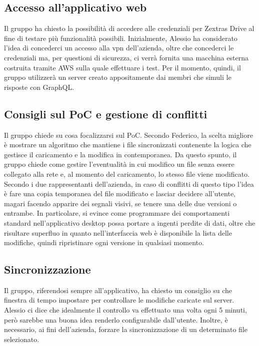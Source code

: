 \subsection{Accesso all'applicativo web}
Il gruppo ha chiesto la possibilità di accedere alle credenziali per Zextras Drive al fine di testare più funzionalità possibili. Inizialmente, Alessio ha considerato l'idea di concederci un accesso alla vpn dell'azienda, oltre che concederci le credenziali ma, per questioni di sicurezza, ci verrà fornita una macchina esterna costruita tramite AWS sulla quale effettuare i test. Per il momento, quindi, il gruppo utilizzerà un server creato appositamente dai membri che simuli le risposte con GraphQL.
\subsection{Consigli sul PoC e gestione di conflitti}
Il gruppo chiede su cosa focalizzarsi sul PoC. Secondo Federico, la scelta migliore è mostrare un algoritmo che mantiene i file sincronizzati contenente la logica che gestisce il caricamento e la modifica in contemporanea. Da questo spunto, il gruppo chiede come gestire l'eventualità in cui modifico un file senza essere collegato alla rete e, al momento del caricamento, lo stesso file viene modificato. Secondo i due rappresentanti dell'azienda, in caso di conflitti di questo tipo l'idea è fare una copia temporanea del file modificato e lasciar decidere all'utente, magari facendo apparire dei segnali visivi, se tenere una delle due versioni o entrambe.  In particolare, si evince come programmare dei comportamenti standard nell'applicativo desktop possa portare a ingenti perdite di dati, oltre che risultare superfluo in quanto nell'interfaccia web è disponibile la lista delle modifiche, quindi ripristinare ogni versione in qualsiasi momento. 
\subsection{Sincronizzazione}
Il gruppo, riferendosi sempre all'applicativo, ha chiesto un consiglio su che finestra di tempo impostare per controllare le modifiche caricate sul server. Alessio ci dice che idealmente il controllo va effettuato una volta ogni 5 minuti, però sarebbe una buona idea renderlo configurabile dall'utente. Inoltre, è necessario, ai fini dell'azienda, forzare la sincronizzazione di un determinato file selezionato.
\newpage

